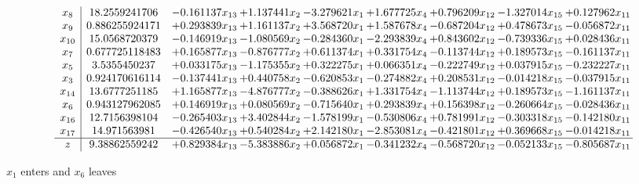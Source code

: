 \documentclass[10pt]{article}
\begin{document}
 \[\begin{array}{c| c c@{\hskip 2pt} c@{\hskip 2pt} c@{\hskip 2pt} c@{\hskip 2pt} c@{\hskip 2pt} c@{\hskip 2pt} c@{\hskip 2pt} }
 x_{8}   &  18.2559241706 & -0.161137 x_{13} & + 1.137441 x_{2} & -3.279621 x_{1} & + 1.677725 x_{4} & + 0.796209 x_{12} & -1.327014 x_{15} & + 0.127962 x_{11}\\
 x_{9}   &  0.886255924171 & + 0.293839 x_{13} & + 1.161137 x_{2} & + 3.568720 x_{1} & + 1.587678 x_{4} & -0.687204 x_{12} & + 0.478673 x_{15} & -0.056872 x_{11}\\
 x_{10}   &  15.0568720379 & -0.146919 x_{13} & -1.080569 x_{2} & -0.284360 x_{1} & -2.293839 x_{4} & + 0.843602 x_{12} & -0.739336 x_{15} & + 0.028436 x_{11}\\
 x_{7}   &  0.677725118483 & + 0.165877 x_{13} & -0.876777 x_{2} & + 0.611374 x_{1} & + 0.331754 x_{4} & -0.113744 x_{12} & + 0.189573 x_{15} & -0.161137 x_{11}\\
 x_{5}   &  3.5355450237 & + 0.033175 x_{13} & -1.175355 x_{2} & + 0.322275 x_{1} & + 0.066351 x_{4} & -0.222749 x_{12} & + 0.037915 x_{15} & -0.232227 x_{11}\\
 x_{3}   &  0.924170616114 & -0.137441 x_{13} & + 0.440758 x_{2} & -0.620853 x_{1} & -0.274882 x_{4} & + 0.208531 x_{12} & -0.014218 x_{15} & -0.037915 x_{11}\\
 x_{14}   &  13.6777251185 & + 1.165877 x_{13} & -4.876777 x_{2} & -0.388626 x_{1} & + 1.331754 x_{4} & -1.113744 x_{12} & + 0.189573 x_{15} & -1.161137 x_{11}\\
 x_{6}   &  0.943127962085 & + 0.146919 x_{13} & + 0.080569 x_{2} & -0.715640 x_{1} & + 0.293839 x_{4} & + 0.156398 x_{12} & -0.260664 x_{15} & -0.028436 x_{11}\\
 x_{16}   &  12.7156398104 & -0.265403 x_{13} & + 3.402844 x_{2} & -1.578199 x_{1} & -0.530806 x_{4} & + 0.781991 x_{12} & -0.303318 x_{15} & -0.142180 x_{11}\\
 x_{17}   &  14.971563981 & -0.426540 x_{13} & + 0.540284 x_{2} & + 2.142180 x_{1} & -2.853081 x_{4} & -0.421801 x_{12} & + 0.369668 x_{15} & -0.014218 x_{11}\\
\hline
z    &  9.38862559242 & + 0.829384 x_{13} & -5.383886 x_{2} & + 0.056872 x_{1} & -0.341232 x_{4} & -0.568720 x_{12} & -0.052133 x_{15} & -0.805687 x_{11}\\
\end{array}\]


 $ x_{1} $ enters and $ x_{6} $ leaves 
\end{document}
